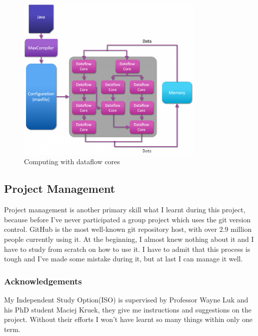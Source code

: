\documentclass[12pt, runningheads,a4paper]{llncs}
\begin{document}
 \begin{figure}
     \centering
\includegraphics[width=0.8\textwidth]{./figs/DFE.png}
        \caption{Computing with dataflow cores}     
           \label{fig:dfe}
  \end{figure}


\subsection{Project Management}
Project management is another primary skill what I learnt during this project, because before I've never participated a group project which uses the git version control. GitHub is the most well-known git repository host, with over 2.9 million people currently using it. At the beginning, I almost knew nothing about it and I have to study from scratch on how to use it. I have to admit that this process is tough and I've made some mistake during it, but at last I can manage it well.

\subsubsection*{Acknowledgements}
My Independent Study Option(ISO) is supervised by Professor Wayne Luk and his PhD student Maciej Kruek, they give me instructions and suggestions on the project. Without their efforts I won't have learnt so many things within only one term.
 



%
\end{document}
